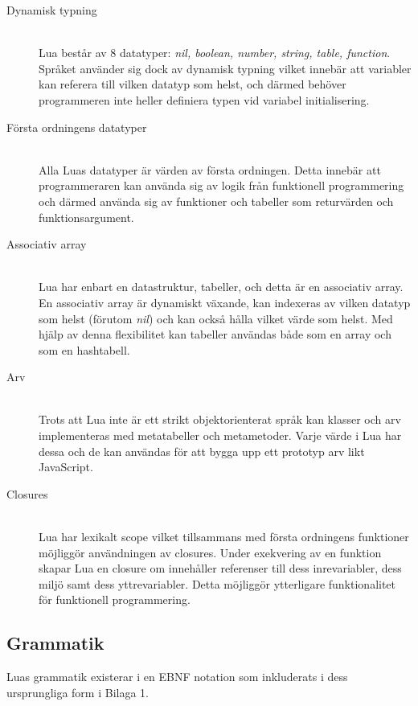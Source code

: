\begin{description}
  \item[Dynamisk typning] \hfill \\
    Lua består av 8 datatyper: \textit{nil, boolean, number, string, table,
    function}. Språket använder sig dock av dynamisk typning vilket innebär att
    variabler kan referera till vilken datatyp som helst, och därmed behöver
    programmeren inte heller definiera typen vid variabel initialisering.

  \item[Första ordningens datatyper] \hfill \\
    Alla Luas datatyper är värden av första ordningen. Detta innebär att
    programmeraren kan använda sig av logik från funktionell programmering och
    därmed använda sig av funktioner och tabeller som returvärden och
    funktionsargument.

  \item[Associativ array] \hfill \\
    Lua har enbart en datastruktur, tabeller, och detta är en associativ
    array. En associativ array är dynamiskt växande, kan indexeras av vilken
    datatyp som helst (förutom \textit{nil}) och kan också hålla vilket värde
    som helst. Med hjälp av denna flexibilitet kan tabeller användas både som
    en array och som en hashtabell.

  \item[Arv] \hfill \\
    Trots att Lua inte är ett strikt objektorienterat språk kan klasser och
    arv implementeras med metatabeller och metametoder. Varje värde i Lua har
    dessa och de kan användas för att bygga upp ett prototyp arv likt
    JavaScript.

  \item[Closures] \hfill \\
    Lua har lexikalt scope vilket tillsammans med första ordningens funktioner
    möjliggör användningen av closures. Under exekvering av en funktion skapar
    Lua en closure om innehåller referenser till dess inrevariabler, dess
    miljö samt dess yttrevariabler. Detta möjliggör ytterligare funktionalitet
    för funktionell programmering.
\end{description}

\subsection{Grammatik}

Luas grammatik existerar i en EBNF notation som inkluderats i dess
ursprungliga form i Bilaga 1.

